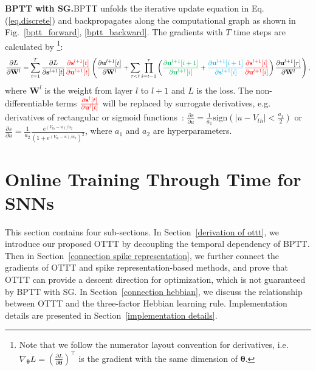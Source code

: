 \documentclass{article}
\begin{document}
\textbf{BPTT with SG.}\quad BPTT unfolds the iterative update equation in Eq.(\ref{eq.discrete}) and backpropagates along the computational graph as shown in Fig.~\ref{bptt_forward}, \ref{bptt_backward}. The gradients with $T$ time steps are calculated by \footnote{Note that we follow the numerator layout convention for derivatives, i.e. $\nabla_{\bm{\theta}}L=\left(\frac{\partial L}{\partial \bm{\theta}}\right)^\top$ is the gradient with the same dimension of $\bm{\theta}$.\label{footnote1}}:
\begin{equation}
\small
    \frac{\partial L}{\partial \mathbf{W}^l}=\sum_{t=1}^T \frac{\partial L}{\partial \mathbf{s}^{l+1}[t]}{\color{red}\frac{\partial \mathbf{s}^{l+1}[t]}{\partial \mathbf{u}^{l+1}[t]}}\left(\frac{\partial \mathbf{u}^{l+1}[t]}{\partial \mathbf{W}^l}+\sum_{\tau < t}\prod_{i=t-1}^{\tau}\left({\color[rgb]{0,0.69,0.31}\frac{\partial \mathbf{u}^{l+1}[i+1]}{\partial \mathbf{u}^{l+1}[i]}}+{\color{cyan}\frac{\partial \mathbf{u}^{l+1}[i+1]}{\partial \mathbf{s}^{l+1}[i]}}{\color{red}\frac{\partial \mathbf{s}^{l+1}[i]}{\partial \mathbf{u}^{l+1}[i]}}\right)\frac{\partial \mathbf{u}^{l+1}[\tau]}{\partial \mathbf{W}^l}\right),
    \label{bptt gradient}
\end{equation}
where $\mathbf{W}^l$ is the weight from layer $l$ to $l+1$ and $L$ is the loss. The non-differentiable terms $\color{red}\frac{\partial \mathbf{s}^{l}[t]}{\partial \mathbf{u}^{l}[t]}$ will be replaced by surrogate derivatives, e.g. derivatives of  rectangular or sigmoid functions~\cite{wu2018spatio}: $\frac{\partial s}{\partial u}=\frac{1}{a_1}\text{sign}\left(\lvert u - V_{th} \rvert < \frac{a_1}{2}\right)$ or $\frac{\partial s}{\partial u}=\frac{1}{a_2}\frac{e^{(V_{th}-u)/a_2}}{(1+e^{(V_{th}-u)/a_2})^2}$, where $a_1$ and $a_2$ are hyperparameters.


\section{Online Training Through Time for SNNs}\label{sec:method}
\vspace{-2mm}

This section contains four sub-sections. In Section~\ref{derivation of ottt}, we introduce our proposed OTTT by decoupling the temporal dependency of BPTT. Then in Section~\ref{connection spike representation}, we further connect the gradients of OTTT and spike representation-based methods, and prove that OTTT can provide a descent direction for optimization, which is not guaranteed by BPTT with SG. In Section~\ref{connection hebbian}, we discuss the relationship between OTTT and the three-factor Hebbian learning rule. Implementation details are presented in Section~\ref{implementation details}.
\end{document}
